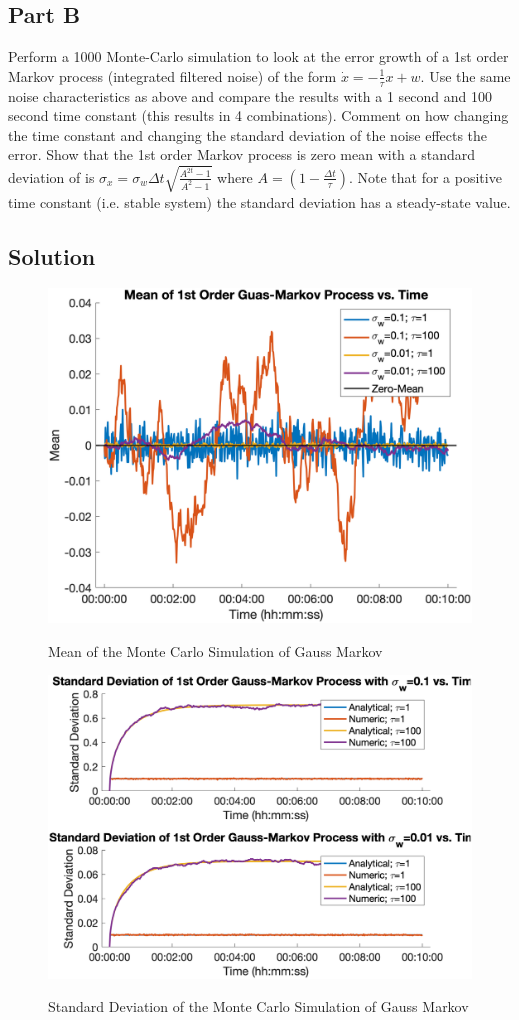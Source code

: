 \documentclass{article}
\begin{document}
\subsection*{Part B}
Perform a 1000 Monte-Carlo simulation to look at the error growth of a 1st order Markov
process (integrated filtered noise) of the form $\dot{x} = -\frac{1}{\tau}x+w$. Use the same noise characteristics as above and compare the results with a 1 second and 100 second time
constant (this results in 4 combinations). Comment on how changing the time constant
and changing the standard deviation of the noise effects the error. Show that the 1st order
Markov process is zero mean with a standard deviation of is $\sigma_x = \sigma_w\Delta t\sqrt{\frac{A^{2t}-1}{A^2-1}}$ where $A = (1-\frac{\Delta t}{\tau})$. Note that for a positive time constant (i.e. stable system) the standard deviation has a steady-state value.

\subsection*{Solution}
\begin{figure}[H]
    \centering
    \includegraphics[width=0.75\linewidth]{../figures/p2_gm_mean.png}\label{fig:p2_gm_mean}
    \caption{Mean of the Monte Carlo Simulation of Gauss Markov}
\end{figure}

\begin{figure}[H]
    \centering
    \includegraphics[width=0.75\linewidth]{../figures/p2_gm_sigma.png}\label{fig:p2_gm_sigma}
    \caption{Standard Deviation of the Monte Carlo Simulation of Gauss Markov}
\end{figure}
\end{document}
